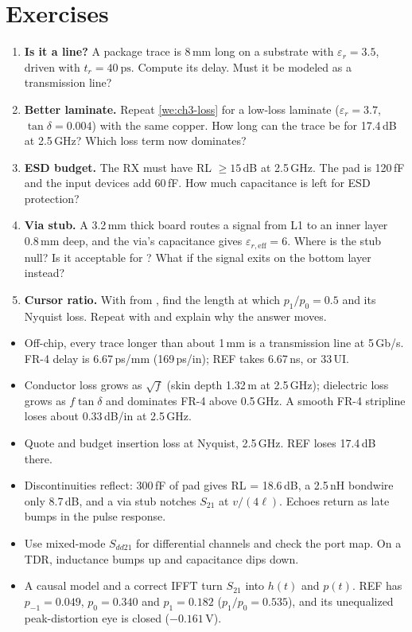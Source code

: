\section{Exercises}\label{sec:ch3-exercises}
\begin{enumerate}[label=\textbf{3.\arabic*},leftmargin=2.2em]
  \item \textbf{Is it a line?} A package trace is 8\,mm long on a substrate with $\varepsilon_r = 3.5$, driven with $t_r = \qty{40}{\pico\second}$. Compute its delay. Must it be modeled as a transmission line?
  \item \textbf{Better laminate.} Repeat \cref{we:ch3-loss} for a low-loss laminate ($\varepsilon_r = 3.7$, $\tan\delta = 0.004$) with the same copper. How long can the trace be for 17.4\,dB at 2.5\,GHz? Which loss term now dominates?
  \item \textbf{ESD budget.} The RX must have RL $\ge 15$\,dB at 2.5\,GHz. The pad is 120\,fF and the input devices add 60\,fF. How much capacitance is left for ESD protection?
  \item \textbf{Via stub.} A 3.2\,mm thick board routes a signal from L1 to an inner layer 0.8\,mm deep, and the via's capacitance gives $\varepsilon_{r,\mathrm{eff}} = 6$. Where is the stub null? Is it acceptable for \OS{}? What if the signal exits on the bottom layer instead?
  \item \textbf{Cursor ratio.} With  from , find the length at which $p_1/p_0 = 0.5$ and its Nyquist loss. Repeat with  and explain why the answer moves.
\end{enumerate}

\begin{takeaways}
\begin{itemize}
  \item Off-chip, every trace longer than about 1\,mm is a transmission line at 5\,Gb/s. FR-4 delay is 6.67\,ps/mm (169\,ps/in); REF takes 6.67\,ns, or 33\,UI.
  \item Conductor loss grows as $\sqrt f$ (skin depth 1.32\,\textmu m at 2.5\,GHz); dielectric loss grows as $f\tan\delta$ and dominates FR-4 above 0.5\,GHz. A smooth FR-4 stripline loses about 0.33\,dB/in at 2.5\,GHz.
  \item Quote and budget insertion loss at Nyquist, 2.5\,GHz. REF loses 17.4\,dB there.
  \item Discontinuities reflect: 300\,fF of pad gives RL = 18.6\,dB, a 2.5\,nH bondwire only 8.7\,dB, and a via stub notches $S_{21}$ at $v/(4\ell)$. Echoes return as late bumps in the pulse response.
  \item Use mixed-mode $S_{dd21}$ for differential channels and check the port map. On a TDR, inductance bumps up and capacitance dips down.
  \item A causal model and a correct IFFT turn $S_{21}$ into $h(t)$ and $p(t)$. REF has $p_{-1} = 0.049$, $p_0 = 0.340$ and $p_1 = 0.182$ ($p_1/p_0 = 0.535$), and its unequalized peak-distortion eye is closed ($-0.161$\,V).
\end{itemize}
\end{takeaways}

